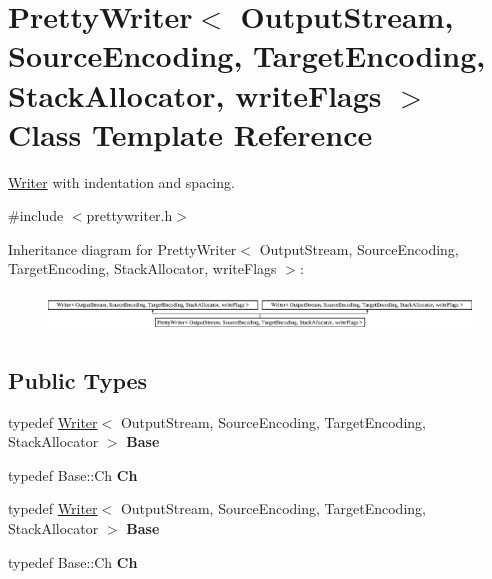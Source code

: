 \hypertarget{class_pretty_writer}{}\section{Pretty\+Writer$<$ Output\+Stream, Source\+Encoding, Target\+Encoding, Stack\+Allocator, write\+Flags $>$ Class Template Reference}
\label{class_pretty_writer}


\hyperlink{class_writer}{Writer} with indentation and spacing.  




{\ttfamily \#include $<$prettywriter.\+h$>$}

Inheritance diagram for Pretty\+Writer$<$ Output\+Stream, Source\+Encoding, Target\+Encoding, Stack\+Allocator, write\+Flags $>$\+:\begin{figure}[H]
\begin{center}
\leavevmode
\includegraphics[height=1.025641cm]{class_pretty_writer}
\end{center}
\end{figure}
\subsection*{Public Types}
\begin{DoxyCompactItemize}
\item 
typedef \hyperlink{class_writer}{Writer}$<$ Output\+Stream, Source\+Encoding, Target\+Encoding, Stack\+Allocator $>$ {\bfseries Base}\hypertarget{class_pretty_writer_adb8bbfb9058e97d6936f34165dec7268}{}\label{class_pretty_writer_adb8bbfb9058e97d6936f34165dec7268}

\item 
typedef Base\+::\+Ch {\bfseries Ch}\hypertarget{class_pretty_writer_ae35c89bda4c5d59d3ff6efcf2fea45a3}{}\label{class_pretty_writer_ae35c89bda4c5d59d3ff6efcf2fea45a3}

\item 
typedef \hyperlink{class_writer}{Writer}$<$ Output\+Stream, Source\+Encoding, Target\+Encoding, Stack\+Allocator $>$ {\bfseries Base}\hypertarget{class_pretty_writer_adb8bbfb9058e97d6936f34165dec7268}{}\label{class_pretty_writer_adb8bbfb9058e97d6936f34165dec7268}

\item 
typedef Base\+::\+Ch {\bfseries Ch}\hypertarget{class_pretty_writer_ae35c89bda4c5d59d3ff6efcf2fea45a3}{}\label{class_pretty_writer_ae35c89bda4c5d59d3ff6efcf2fea45a3}

\end{DoxyCompactItemize}
